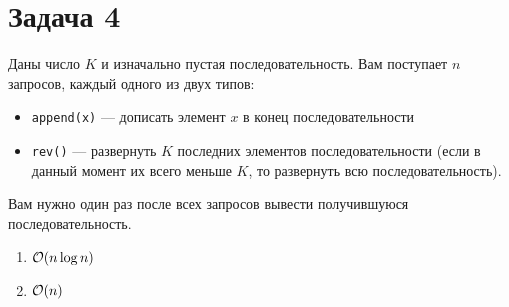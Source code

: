 \section{Задача 4}
Даны число $K$ и изначально пустая последовательность. Вам поступает $n$ запросов, каждый одного из двух типов:
\begin{itemize}
    \item \texttt{append(x)} --- дописать элемент $x$ в конец последовательности
    \item \texttt{rev()} ---
    развернуть $K$ последних элементов последовательности (если в данный момент их всего меньше $K$, то
    развернуть всю последовательность).
\end{itemize}

Вам нужно один раз после всех запросов вывести получившуюся последовательность.
\begin{enumerate}[label=(\alph*)]
    \item $\mathcal{O}(n \log{n})$
    \item $\mathcal{O}(n)$
\end{enumerate}
